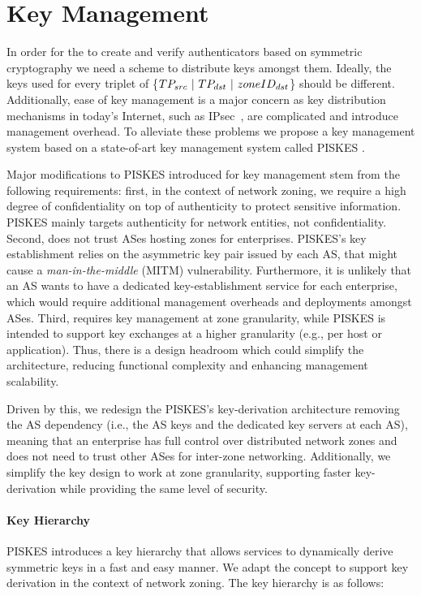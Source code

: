 \section{Key Management}
\label{sec:keymanagement}

In order for the \tps to create and verify authenticators based on symmetric cryptography 
we need a scheme to distribute keys amongst them. Ideally, the keys used for every 
triplet of \{$TP_{src}~|~TP_{dst}~|~zoneID_{dst}$\} should be different. Additionally, 
ease of key management is a major concern as key distribution mechanisms in today's 
Internet, such as IPsec~\cite{rfc2408,rfc2409,rfc4306}, are complicated and introduce 
management overhead. To alleviate these problems we propose a key management system 
based on a state-of-art key management system called PISKES \cite{rot2020piskes}.

Major modifications to PISKES introduced for \name key management stem from the following requirements: first,
in the context of network zoning, we require a high degree of confidentiality on top of
authenticity to protect sensitive information. PISKES mainly targets authenticity for 
network entities, not confidentiality. Second, \name does not trust ASes hosting zones
for enterprises. PISKES's key establishment relies on the asymmetric key pair issued by
each AS, that might cause a \textit{man-in-the-middle} (MITM) vulnerability. Furthermore, it is unlikely that an AS 
wants to have a dedicated key-establishment service for each enterprise, which would require 
additional management overheads and deployments amongst ASes. Third, \name requires key 
management at zone granularity, while PISKES is intended to support key exchanges at a 
higher granularity (e.g., per host or application). Thus, there is a design headroom which 
could simplify the architecture, reducing functional complexity and enhancing management
scalability.

Driven by this, we redesign the PISKES's key-derivation architecture removing the
AS dependency (i.e., the AS keys and the dedicated key servers at each AS), meaning
that an enterprise has full control over distributed network zones and does not
need to trust other ASes for inter-zone networking. Additionally, we simplify the key 
design to work at zone granularity, supporting faster key-derivation while
providing the same level of security. 

\paragraph{Key Hierarchy}
PISKES introduces a key hierarchy that allows services to dynamically derive symmetric 
keys in a fast and easy manner. We adapt the concept to support key derivation in the 
context of network zoning. The key hierarchy is as follows:

